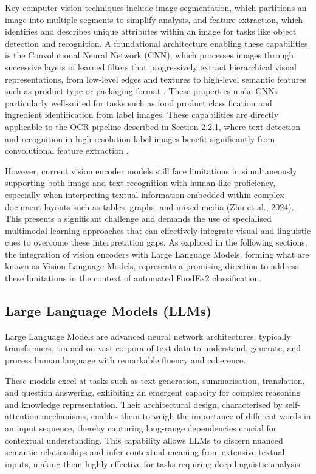 Key computer vision techniques include image segmentation, which partitions an image into multiple segments to simplify analysis, and feature extraction, which identifies and describes unique attributes within an image for tasks like object detection and recognition. A foundational architecture enabling these capabilities is the Convolutional Neural Network (CNN), which processes images through successive layers of learned filters that progressively extract hierarchical visual representations, from low-level edges and textures to high-level semantic features such as product type or packaging format \parencite{pouria_sadeghi_tehran_a39d38db}. These properties make CNNs particularly well-suited for tasks such as food product classification and ingredient identification from label images. These capabilities are directly applicable to the OCR pipeline described in Section 2.2.1, where text detection and recognition in high-resolution label images benefit significantly from convolutional feature extraction \parencite{renqing_luo_2e752c97}.

However, current vision encoder models still face limitations in simultaneously supporting both image and text recognition with human-like proficiency, especially when interpreting textual information embedded within complex document layouts such as tables, graphs, and mixed media (Zhu et al., 2024). This presents a significant challenge and demands the use of specialised multimodal learning approaches that can effectively integrate visual and linguistic cues to overcome these interpretation gaps. As explored in the following sections, the integration of vision encoders with Large Language Models, forming what are known as Vision-Language Models, represents a promising direction to address these limitations in the context of automated FoodEx2 classification.

\hypertarget{large-language-models-llms}{%
\subsection{Large Language Models (LLMs)}\label{large-language-models-llms}}

Large Language Models are advanced neural network architectures, typically transformers, trained on vast corpora of text data to understand, generate, and process human language with remarkable fluency and coherence.

These models excel at tasks such as text generation, summarisation, translation, and question answering, exhibiting an emergent capacity for complex reasoning and knowledge representation. Their architectural design, characterised by self-attention mechanisms, enables them to weigh the importance of different words in an input sequence, thereby capturing long-range dependencies crucial for contextual understanding. This capability allows LLMs to discern nuanced semantic relationships and infer contextual meaning from extensive textual inputs, making them highly effective for tasks requiring deep linguistic analysis.

